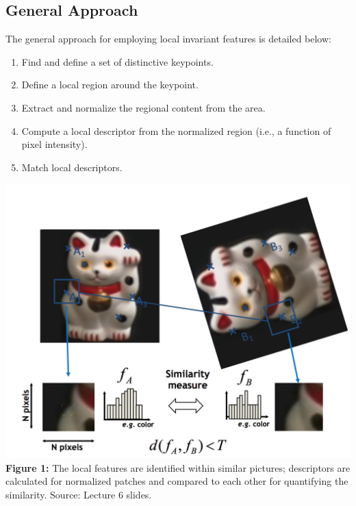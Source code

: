 \documentclass{article}
\begin{document}
\subsection{General Approach}
The general approach for employing local invariant features is detailed below:
\begin{enumerate}
\item Find and define a set of distinctive keypoints.
\item Define a local region around the keypoint.
\item Extract and normalize the regional content from the area.
\item Compute a local descriptor from the normalized region (i.e., a function of pixel intensity).
\item Match local descriptors.
\end{enumerate}
\begin{center}
	\includegraphics[scale=0.5]{local_feature_ex.png}\\
  	\textbf{Figure 1:} The local features are identified within similar pictures; descriptors are calculated for normalized patches and compared to each other for quantifying the similarity. Source: Lecture 6 slides. \\
\end{center}
\end{document}
